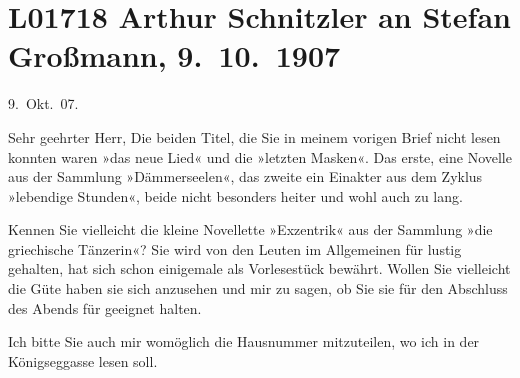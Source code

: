 

\section[Arthur Schnitzler an Stefan Großmann, 9. 10. 1907]{L01718 Arthur Schnitzler an Stefan Großmann, 9. 10. 1907}
\nopagebreak{}
\rehead{ }\normalsize\beginnumbering{}
\toendnotes[C]{\smallbreak\pagebreak[2]}
\toendnotes[C]{\smallbreak}
\pstart
           \raggedleft{}{\pb}9. Okt. 07. \pend
           
\pstart{}Sehr geehrter Herr,\pend\vspace{0.5em}
\pstart
           Die beiden Titel, die Sie in meinem vorigen Brief nicht lesen konnten waren »das neue Lied« und die »letzten Masken«. Das erste, eine Novelle aus der Sammlung
                  »Dämmerseelen«, das zweite ein Einakter aus
               dem Zyklus »lebendige Stunden«, beide nicht
               besonders heiter und wohl auch zu lang.\pend
           
\pstart
           Kennen Sie vielleicht die kleine Novellette »Exzentrik« aus der Sammlung »die griechische
                  Tänzerin«? Sie wird von den Leuten im Allgemeinen für lustig gehalten, hat
               sich schon einigemale als Vorlesestück bewährt. Wollen Sie vielleicht die Güte haben
               sie sich anzusehen und mir zu sagen, ob Sie sie für den Abschluss des Abends für
               geeignet halten.\pend
           
\pstart
           Ich bitte Sie auch mir womöglich die Hausnummer mitzuteilen, wo ich in der Königseggasse lesen soll.\pend
           
